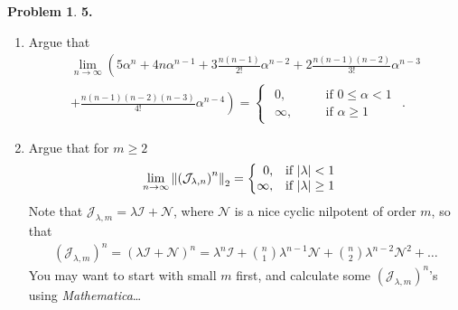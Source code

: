 \documentclass{article}
\theoremstyle{definition}
\newtheorem*{prob*}{Problem}
\newcommand{\jor}{\mathcal{J}}
\begin{document}
\begin{prob*}\textbf{5. }\\
	\begin{enumerate}
		\item Argue that
		\begin{align*}
		\lim\limits_{n\to \infty} \left(    5\alpha^n + 4n\alpha^{n-1} + 3\frac{n(n-1)}{2!}\alpha^{n-2} + 2\frac{n(n-1)(n-2)}{3!}\alpha^{n-3}    \right.\\
		 \left.  + \frac{n(n-1)(n-2)(n-3)}{4!}\alpha^{n-4} \right) 
		= \begin{cases}
		\begin{alignedat}{2}
		0, & \quad & \text{if } 0 \leq \alpha < 1\\
		\infty, & \quad & \text{if } \alpha \geq 1
		\end{alignedat}
		\end{cases}.
		\end{align*}
		
		
		
		\item Argue that for $m\geq 2$
		\begin{align*}
		\lim\limits_{n\to \infty}\norm{\left(\jor_{\lambda,n}\right)^n}_2 
		= 
		\begin{cases}
		\begin{alignedat}{2}
		0, & \quad & \text{if } \abs{\lambda} < 1&\\
		\infty, & \quad & \text{if } \abs{\lambda} \geq 1&
		\end{alignedat}
		\end{cases}
		\end{align*}
		Note that $\jor_{\lambda,m} = \lambda\mathcal{I} + \mathcal{N}$, where $\mathcal{N}$ is a nice cyclic nilpotent of order $m$, so that
		\begin{align*}
		\left(\jor_{\lambda,m}\right)^n = \left(\lambda\mathcal{I} + \mathcal{N}\right)^n = 
		\lambda^n \mathcal{I} + {n\choose 1}\lambda^{n-1}\mathcal{N} + {n\choose 2}\lambda^{n-2}\mathcal{N}^2 + \dots
		\end{align*}
		You may want to start with small $m$ first, and calculate some $\left(\jor_{\lambda,m}\right)^n$'s using \textit{Mathematica}\dots
	\end{enumerate}




\end{prob*}
\end{document}
